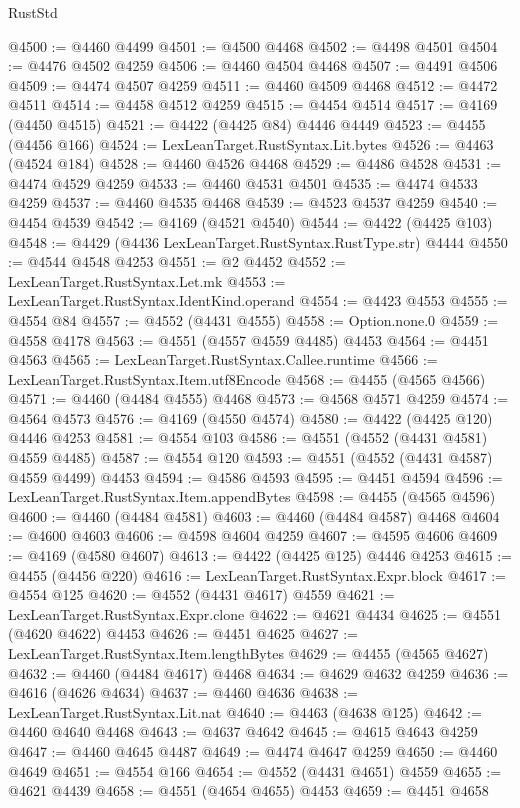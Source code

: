 \begin{lexlean}{RustStd}
\begin{coremodule}
@4500 := @4460 @4499
@4501 := @4500 @4468
@4502 := @4498 @4501
@4504 := @4476 @4502 @4259
@4506 := @4460 @4504 @4468
@4507 := @4491 @4506
@4509 := @4474 @4507 @4259
@4511 := @4460 @4509 @4468
@4512 := @4472 @4511
@4514 := @4458 @4512 @4259
@4515 := @4454 @4514
@4517 := @4169 (@4450 @4515)
@4521 := @4422 (@4425 @84) @4446 @4449
@4523 := @4455 (@4456 @166)
@4524 := LexLeanTarget.RustSyntax.Lit.bytes
@4526 := @4463 (@4524 @184)
@4528 := @4460 @4526 @4468
@4529 := @4486 @4528
@4531 := @4474 @4529 @4259
@4533 := @4460 @4531 @4501
@4535 := @4474 @4533 @4259
@4537 := @4460 @4535 @4468
@4539 := @4523 @4537 @4259
@4540 := @4454 @4539
@4542 := @4169 (@4521 @4540)
@4544 := @4422 (@4425 @103)
@4548 := @4429 (@4436 LexLeanTarget.RustSyntax.RustType.str) @4444
@4550 := @4544 @4548 @4253
@4551 := @2 @4452
@4552 := LexLeanTarget.RustSyntax.Let.mk
@4553 := LexLeanTarget.RustSyntax.IdentKind.operand
@4554 := @4423 @4553
@4555 := @4554 @84
@4557 := @4552 (@4431 @4555)
@4558 := Option.none.{0}
@4559 := @4558 @4178
@4563 := @4551 (@4557 @4559 @4485) @4453
@4564 := @4451 @4563
@4565 := LexLeanTarget.RustSyntax.Callee.runtime
@4566 := LexLeanTarget.RustSyntax.Item.utf8Encode
@4568 := @4455 (@4565 @4566)
@4571 := @4460 (@4484 @4555) @4468
@4573 := @4568 @4571 @4259
@4574 := @4564 @4573
@4576 := @4169 (@4550 @4574)
@4580 := @4422 (@4425 @120) @4446 @4253
@4581 := @4554 @103
@4586 := @4551 (@4552 (@4431 @4581) @4559 @4485)
@4587 := @4554 @120
@4593 := @4551 (@4552 (@4431 @4587) @4559 @4499) @4453
@4594 := @4586 @4593
@4595 := @4451 @4594
@4596 := LexLeanTarget.RustSyntax.Item.appendBytes
@4598 := @4455 (@4565 @4596)
@4600 := @4460 (@4484 @4581)
@4603 := @4460 (@4484 @4587) @4468
@4604 := @4600 @4603
@4606 := @4598 @4604 @4259
@4607 := @4595 @4606
@4609 := @4169 (@4580 @4607)
@4613 := @4422 (@4425 @125) @4446 @4253
@4615 := @4455 (@4456 @220)
@4616 := LexLeanTarget.RustSyntax.Expr.block
@4617 := @4554 @125
@4620 := @4552 (@4431 @4617) @4559
@4621 := LexLeanTarget.RustSyntax.Expr.clone
@4622 := @4621 @4434
@4625 := @4551 (@4620 @4622) @4453
@4626 := @4451 @4625
@4627 := LexLeanTarget.RustSyntax.Item.lengthBytes
@4629 := @4455 (@4565 @4627)
@4632 := @4460 (@4484 @4617) @4468
@4634 := @4629 @4632 @4259
@4636 := @4616 (@4626 @4634)
@4637 := @4460 @4636
@4638 := LexLeanTarget.RustSyntax.Lit.nat
@4640 := @4463 (@4638 @125)
@4642 := @4460 @4640 @4468
@4643 := @4637 @4642
@4645 := @4615 @4643 @4259
@4647 := @4460 @4645 @4487
@4649 := @4474 @4647 @4259
@4650 := @4460 @4649
@4651 := @4554 @166
@4654 := @4552 (@4431 @4651) @4559
@4655 := @4621 @4439
@4658 := @4551 (@4654 @4655) @4453
@4659 := @4451 @4658

\end{coremodule}
\end{lexlean}
